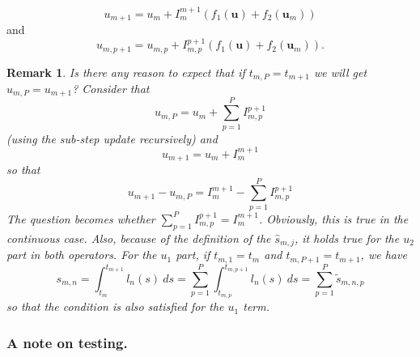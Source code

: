 \documentclass{article}
\newtheorem{remark}{Remark}
\newcommand{\ve}[1]{\mathbf{#1}}
\begin{document}
\begin{equation}
	u_{m+1} = u_{m} + I_m^{m+1} \left( f_1(\ve{u}) + f_2(\ve{u}_m) \right)
\end{equation}
and
\begin{equation}
	u_{m,p+1} = u_{m,p} + I_{m,p}^{p+1} \left( f_1(\ve{u}) + f_2(\ve{u}_m) \right).
\end{equation}
\begin{remark}
Is there any reason to expect that if $t_{m,P} = t_{m+1}$ we will get $u_{m,P} = u_{m+1}$? Consider that
\begin{equation}
	u_{m,P} = u_{m} + \sum_{p=1}^{P} I_{m,p}^{p+1}
\end{equation}
(using the sub-step update recursively) and
\begin{equation}
	u_{m+1} = u_m + I_{m}^{m+1}
\end{equation}
so that
\begin{equation}
	u_{m+1} - u_{m,P} = I_{m}^{m+1} - \sum_{p=1}^{P} I_{m,p}^{p+1}
\end{equation}
The question becomes whether $\sum_{p=1}^{P} I_{m,p}^{p+1} = I_{m}^{m+1}$.
Obviously, this is true in the continuous case.
Also, because of the definition of the $\hat{s}_{m,j}$, it holds true for the $u_2$ part in both operators.
For the $u_1$ part, if $t_{m,1} = t_m$ and $t_{m,P+1} = t_{m+1}$, we have
\begin{equation}
	s_{m,n} = \int_{t_m}^{t_{m+1}} l_n(s)~ds = \sum_{p=1}^{P} \int_{t_{m,p}}^{t_{m,p+1}} l_n(s)~ds = \sum_{p=1}^{P} \tilde{s}_{m,n,p}
\end{equation}
so that the condition is also satisfied for the $u_1$ term.
\end{remark}

\subsubsection{A note on testing.}
\end{document}
